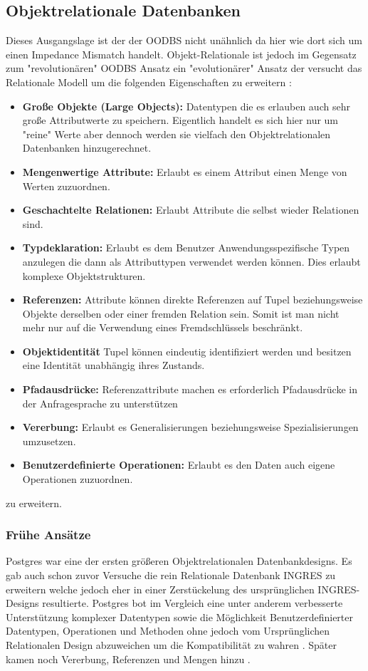 \subsection{Objektrelationale Datenbanken}
Dieses Ausgangslage ist der der OODBS nicht unähnlich da hier wie dort sich um einen Impedance Mismatch handelt. Objekt-Relationale ist jedoch im Gegensatz zum "{}revolutionären"{} OODBS Ansatz ein "{}evolutionärer"{} Ansatz der versucht das Relationale Modell um die folgenden Eigenschaften zu erweitern \cite{kemper2013}:
\begin{itemize}
	\item \textbf{Große Objekte (Large Objects):} Datentypen die es erlauben auch sehr große Attributwerte zu speichern. Eigentlich handelt es sich hier nur um "{}reine"{} Werte aber dennoch werden sie vielfach den Objektrelationalen Datenbanken hinzugerechnet.
	\item \textbf{Mengenwertige Attribute:} Erlaubt es einem Attribut einen Menge von Werten zuzuordnen.
	\item \textbf{Geschachtelte Relationen:} Erlaubt Attribute die selbst wieder Relationen sind.
	\item \textbf{Typdeklaration:} Erlaubt es dem Benutzer Anwendungsspezifische Typen anzulegen die dann als Attributtypen verwendet werden können. Dies erlaubt komplexe Objektstrukturen.
	\item \textbf{Referenzen:} Attribute können direkte Referenzen auf Tupel beziehungsweise Objekte derselben oder einer fremden Relation sein. Somit ist man nicht mehr nur auf die Verwendung eines Fremdschlüssels beschränkt.
	\item \textbf{Objektidentität} Tupel können eindeutig identifiziert werden und besitzen eine Identität unabhängig ihres Zustands. 
	\item \textbf{Pfadausdrücke:} Referenzattribute machen es erforderlich Pfadausdrücke in der Anfragesprache zu unterstützen
	\item \textbf{Vererbung:} Erlaubt es Generalisierungen beziehungsweise Spezialisierungen umzusetzen.
	\item \textbf{Benutzerdefinierte Operationen:} Erlaubt es den Daten auch eigene Operationen zuzuordnen.
\end{itemize}
zu erweitern.

\subsubsection{Frühe Ansätze}
Postgres war eine der ersten größeren Objektrelationalen Datenbankdesigns. Es gab auch schon zuvor Versuche die rein Relationale Datenbank INGRES zu erweitern welche jedoch eher in einer Zerstückelung des ursprünglichen INGRES-Designs resultierte. Postgres bot im Vergleich eine unter anderem verbesserte Unterstützung komplexer Datentypen sowie die Möglichkeit Benutzerdefinierter Datentypen, Operationen und Methoden ohne jedoch vom Ursprünglichen Relationalen Design abzuweichen um die Kompatibilität zu wahren \cite{stonebraker1986}. Später kamen noch Vererbung, Referenzen und Mengen hinzu \cite{stonebraker1990}. 

